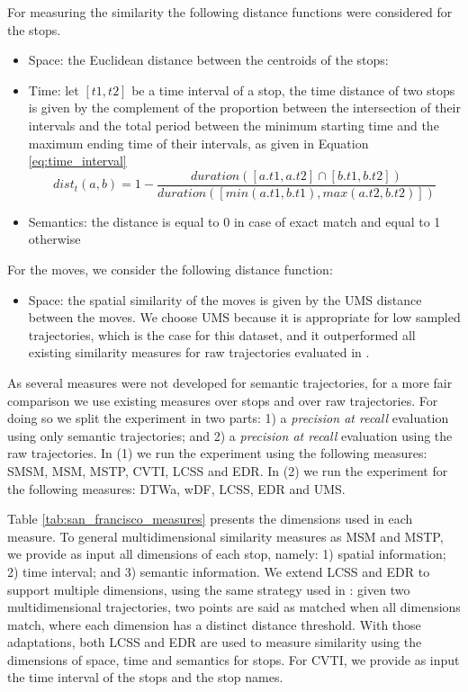 \documentclass[12pt]{article}
\begin{document}
For measuring the similarity the following distance functions were considered for the stops.
\begin{itemize}
  \item Space: the Euclidean distance between the centroids of the stops:
	\item Time: let $[t1, t2]$ be a time interval of a stop, the time distance of two stops is given by the complement of the proportion between the intersection of their intervals and the total period between the minimum starting time and the maximum ending time of their intervals, as given in Equation \ref{eq:time_interval}
\begin{equation} \label{eq:time_interval}
	dist_t(a, b) = 1 - \dfrac{duration([a.t1, a.t2] \cap [b.t1, b.t2])}{duration([min(a.t1, b.t1), max(a.t2, b.t2)])}
\end{equation}
  \item Semantics: the distance is equal to 0 in case of exact match and equal to 1 otherwise
\end{itemize}

For the moves, we consider the following distance function:
\begin{itemize}
  \item Space: the spatial similarity of the moves is given by the UMS distance between the moves. We choose UMS because it is appropriate for low sampled trajectories, which is the case for this dataset, and it outperformed all existing similarity measures for raw trajectories evaluated in \cite{Furtado-UMS-2018}.
\end{itemize}

As several measures were not developed for semantic trajectories, for a more fair comparison we use existing measures over stops and over raw trajectories. For doing so we split the experiment in two parts: 1) a \textit{precision at recall} evaluation using only semantic trajectories; and 2) a \textit{precision at recall} evaluation using the raw trajectories. In (1) we run the experiment using the following measures: SMSM, MSM, MSTP, CVTI, LCSS and EDR. In (2) we run the experiment for the following measures: DTWa, wDF, LCSS, EDR and UMS.

Table {\ref{tab:san_francisco_measures}} presents the dimensions used in each measure. To general multidimensional similarity measures as MSM and MSTP, we provide as input all dimensions of each stop, namely: 1)  spatial information; 2) time interval; and 3) semantic information. We extend LCSS and EDR to support multiple dimensions, using the same strategy used in {\cite{Furtado:TGIS12156}}: given two multidimensional trajectories, two points are said as matched when all dimensions match, where each dimension has a distinct distance threshold. With those adaptations, both LCSS and EDR are used to measure similarity using the dimensions of space, time and semantics for stops. For CVTI, we provide as input the time interval of the stops and the stop names.
\end{document}
